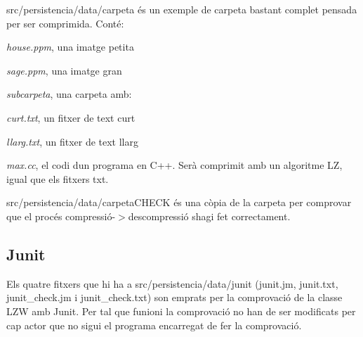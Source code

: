 src/persistencia/data/carpeta és un exemple de carpeta bastant complet pensada per ser comprimida. Conté\+:
\begin{DoxyItemize}
\item {\itshape house.\+ppm}, una imatge petita
\item {\itshape sage.\+ppm}, una imatge gran
\item {\itshape subcarpeta}, una carpeta amb\+:
\begin{DoxyItemize}
\item {\itshape curt.\+txt}, un fitxer de text curt
\item {\itshape llarg.\+txt}, un fitxer de text llarg
\item {\itshape max.\+cc}, el codi d\textquotesingle{}un programa en C++. Serà comprimit amb un algoritme LZ, igual que els fitxers txt.
\end{DoxyItemize}
\end{DoxyItemize}

src/persistencia/data/carpeta\+C\+H\+E\+CK és una còpia de la carpeta per comprovar que el procés compressió-\/$>$descompressió s\textquotesingle{}hagi fet correctament.

\subsection*{Junit}

Els quatre fitxers que hi ha a src/persistencia/data/junit (junit.\+jm, junit.\+txt, junit\+\_\+check.\+jm i junit\+\_\+check.\+txt) son emprats per la comprovació de la classe L\+ZW amb Junit. Per tal que funioni la comprovació no han de ser modificats per cap actor que no sigui el programa encarregat de fer la comprovació. 